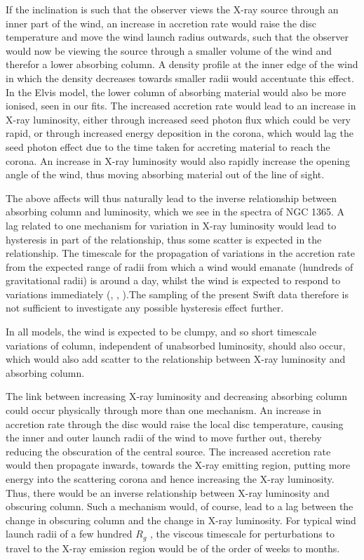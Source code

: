 \documentclass[useAMS,usenatbib]{sam}
\begin{document}
If the inclination is such that the observer views the X-ray source through an inner part of the wind, an increase in accretion rate would raise the disc temperature and
move the wind launch radius outwards, such that the observer would now be viewing the source through a smaller volume of the wind and therefor a lower absorbing column.
A density profile at the inner edge of the wind in which the density decreases towards smaller radii would accentuate this effect. In the Elvis model, the lower column
of absorbing material would also be more ionised, seen in our fits. The increased accretion rate would lead to an increase in X-ray luminosity, either through increased
seed photon flux which could be very rapid, or through increased energy deposition in the corona, which would lag the seed photon effect due to the time taken for
accreting material to reach the corona. An increase in X-ray luminosity would also rapidly increase the opening angle of the wind, thus moving absorbing material out of
the line of sight.

The above affects will thus naturally lead to the inverse relationship between absorbing column and luminosity, which we see in the spectra of NGC 1365. A lag related to
one mechanism for variation in X-ray luminosity would lead to hysteresis in part of the relationship, thus some scatter is expected in the relationship. The timescale for
the propagation of variations in the accretion rate from the expected range of radii from which a wind would emanate (hundreds of gravitational radii) is around a day,
whilst the wind is expected to respond to variations immediately (\citet{treves}, \citet{shakura}, \citet{tombesi}).The sampling of the present Swift data therefore is
not sufficient to investigate any possible hysteresis effect further. 

In all models, the wind is expected to be clumpy, and so short timescale variations of column, independent of unabsorbed luminosity, should also occur, which would also
add scatter to the relationship between X-ray luminosity and absorbing column.

The link between increasing X-ray luminosity and decreasing absorbing column could occur physically through more than one mechanism. An increase in accretion rate through
the disc would raise the local disc temperature, causing the inner and outer launch radii of the wind to move further out, thereby reducing the obscuration of the central
source. The increased accretion rate would then propagate inwards, towards the X-ray emitting region, putting more energy into the scattering corona and hence increasing
the X-ray luminosity. Thus, there would be an inverse relationship between X-ray luminosity and obscuring column. Such a mechanism would, of course, lead to a lag between
the change in obscuring column and the change in X-ray luminosity. For typical wind launch radii of a few hundred $R_g$ \citep{higginbottom}, the viscous timescale for
perturbations to travel to the X-ray emission region would be of the order of weeks to months. 
\end{document}
